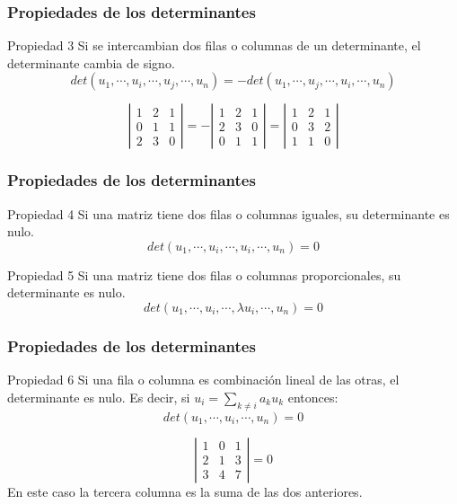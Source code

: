 \documentclass[12pt]{article}
\begin{document}
  
 \begin{frame}
  \frametitle{Propiedades de los determinantes}
   \begin{block}{Propiedad 3}
   Si se intercambian dos filas o columnas de un determinante, el determinante cambia de signo.
   \[det(u_1, \cdots,u_i, \cdots, u_j, \cdots , u_n) = - det(u_1, \cdots,u_j, \cdots, u_i, \cdots , u_n) \]
\end{block}

\[ \left|\begin{array}{ccc}1 & 2 & 1 \\0 & 1 & 1 \\2 & 3 & 0\end{array}\right|
= - \left|\begin{array}{ccc}1 & 2 & 1 \\2 & 3 & 0\\0 & 1 & 1 \end{array}\right|
= \left|\begin{array}{ccc}1 & 2 & 1 \\0 & 3 & 2\\1 & 1 & 0 \end{array}\right|
\]
  \end{frame} 
  
  
   \begin{frame}
  \frametitle{Propiedades de los determinantes}
   \begin{block}{Propiedad 4}
   Si una matriz tiene dos filas o columnas iguales, su determinante es nulo.
   \[det(u_1, \cdots,u_i, \cdots, u_i, \cdots , u_n) = 0 \]
\end{block}

  \begin{block}{Propiedad 5}
   Si una matriz tiene dos filas o columnas proporcionales, su determinante es nulo.
   \[det(u_1, \cdots,u_i, \cdots, \lambda u_i, \cdots , u_n) = 0 \]
\end{block}
  \end{frame} 
  
  
     \begin{frame}
  \frametitle{Propiedades de los determinantes}
   \begin{block}{Propiedad 6}
   Si una fila o columna es combinaci\'on lineal de las otras, el determinante es nulo. Es decir, si $u_i = \sum_{k\neq i} a_k u_k$ entonces:
   \[det(u_1, \cdots,u_i, \cdots, u_n) = 0 \]
   
\end{block}

\[ \left|\begin{array}{ccc}1 & 0 & 1 \\2 & 1 & 3 \\3 & 4 & 7\end{array}\right| = 0\]
En este caso la tercera columna es la suma de las dos anteriores.
   \end{frame} 
  
\end{document}
